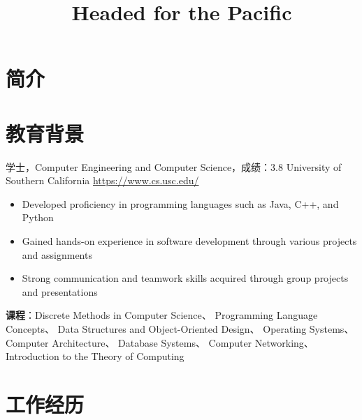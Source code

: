 \documentclass[a4paper, serif, 11pt]{moderncv}
\title{Headed for the Pacific}
\begin{document}
\maketitle

\section{简介}


\section{教育背景}

        {学士，Computer Engineering and Computer Science，成绩：3.8}
        {University of Southern California}
        {\href{https://www.cs.usc.edu/}{https://www.cs.usc.edu/}}
        {}
        {\begin{itemize}
\item Developed proficiency in programming languages such as Java, C++, and Python
\item Gained hands-on experience in software development through various projects and assignments
\item Strong communication and teamwork skills acquired through group projects and presentations
\end{itemize}
\textbf{课程}：Discrete Methods in Computer Science、
Programming Language Concepts、
Data Structures and Object-Oriented Design、
Operating Systems、
Computer Architecture、
Database Systems、
Computer Networking、
Introduction to the Theory of Computing}

\section{工作经历}
\end{document}

